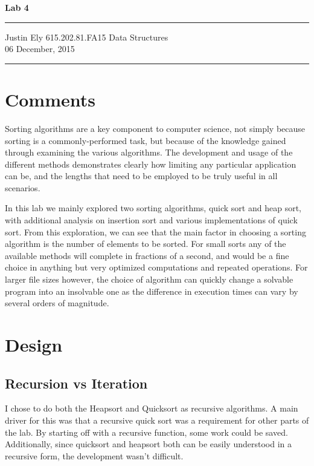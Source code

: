\documentclass[a4paper,12pt]{article}
\begin{document}
\begin{flushright}

\vspace{1.1cm}

{\bf\Huge Lab 4}

\rule{0.25\linewidth}{0.5pt}

\vspace{0.5cm}
Justin Ely
\linebreak
\newline
\footnotesize{615.202.81.FA15 Data Structures \\}
\vspace{0.5cm}
06 December, 2015
\end{flushright}

\noindent\rule{\linewidth}{1.0pt}


\section{Comments}
Sorting algorithms are a key component to computer science, not simply because sorting is a commonly-performed task, but because of the knowledge gained through examining the various algorithms.  The development and usage of the different methods demonstrates clearly how limiting any particular application can be, and the lengths that need to be employed to be truly useful in all scenarios.

In this lab we mainly explored two sorting algorithms, quick sort and heap sort, with additional analysis on insertion sort and various implementations of quick sort.  From this exploration, we can see that the main factor in choosing a sorting algorithm is the number of elements to be sorted.  For small sorts any of the available methods will complete in fractions of a second, and would be a fine choice in anything but very optimized computations and repeated operations.  For larger file sizes however, the choice of algorithm can quickly change a solvable program into an insolvable one as the difference in execution times can vary by several orders of magnitude.



\section{Design}
\subsection{Recursion vs Iteration}
I chose to do both the Heapsort and Quicksort as recursive algorithms.  A main driver for this was that a recursive quick sort was a requirement for other parts of the lab.  By starting off with a recursive function, some work could be saved.  Additionally, since quicksort and heapsort both can be easily understood in a recursive form, the development wasn't difficult.
\end{document}
